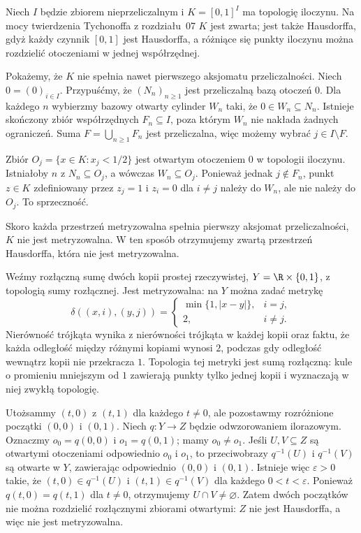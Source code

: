 \begin{przyklad}
\label{ex:topog-kostka-nieprzeliczalna}
Niech $I$ będzie zbiorem nieprzeliczalnym i
$K=[0,1]^I$ ma topologię iloczynu.
Na mocy twierdzenia Tychonoffa z rozdziału~07
$K$ jest zwarta; jest także Hausdorffa, gdyż każdy
czynnik $[0,1]$ jest Hausdorffa, a różniące się punkty
iloczynu można rozdzielić otoczeniami w jednej
współrzędnej.

Pokażemy, że $K$ nie spełnia nawet pierwszego
aksjomatu przeliczalności. Niech $0=(0)_{i\in I}$.
Przypuśćmy, że $(N_n)_{n\ge1}$ jest przeliczalną
bazą otoczeń $0$. Dla każdego $n$ wybierzmy
bazowy otwarty cylinder $W_n$ taki, że
$0\in W_n\subseteq N_n$. Istnieje skończony
zbiór współrzędnych $F_n\subseteq I$, poza którym
$W_n$ nie nakłada żadnych ograniczeń.
Suma $F=\bigcup_{n\ge1}F_n$ jest przeliczalna,
więc możemy wybrać $j\in I\setminus F$.

Zbiór $O_j=\{x\in K:x_j<1/2\}$ jest otwartym
otoczeniem $0$ w topologii iloczynu.
Istniałoby $n$ z $N_n\subseteq O_j$,
a wówczas $W_n\subseteq O_j$.
Ponieważ jednak $j\notin F_n$, punkt $z\in K$
zdefiniowany przez $z_j=1$ i $z_i=0$ dla $i\ne j$
należy do $W_n$, ale nie należy do $O_j$.
To sprzeczność.

Skoro każda przestrzeń metryzowalna spełnia
pierwszy aksjomat przeliczalności, $K$ nie jest
metryzowalna. W ten sposób otrzymujemy zwartą
przestrzeń Hausdorffa, która nie jest metryzowalna.
\end{przyklad}

\clearpage
\begin{przyklad}
\label{ex:topog-iloraz-dwa-poczatki}
Weźmy rozłączną sumę dwóch kopii prostej rzeczywistej,
$Y=\R\times\{0,1\}$, z topologią sumy rozłącznej.
Jest metryzowalna: na $Y$ można zadać metrykę
\[
\delta((x,i),(y,j))=
\begin{cases}
\min\{1,|x-y|\},&i=j,\\
2,&i\ne j.
\end{cases}
\]
Nierówność trójkąta wynika z nierówności trójkąta
w każdej kopii oraz faktu, że każda odległość między
różnymi kopiami wynosi $2$, podczas gdy odległość
wewnątrz kopii nie przekracza $1$.
Topologia tej metryki jest sumą rozłączną: kule
o promieniu mniejszym od $1$ zawierają punkty tylko
jednej kopii i wyznaczają w niej zwykłą topologię.

Utożsammy $(t,0)$ z $(t,1)$ dla każdego $t\ne0$,
ale pozostawmy rozróżnione początki $(0,0)$ i $(0,1)$.
Niech $q\colon Y\to Z$ będzie odwzorowaniem ilorazowym.
Oznaczmy $o_0=q(0,0)$ i $o_1=q(0,1)$; mamy $o_0\ne o_1$.
Jeśli $U,V\subseteq Z$ są otwartymi otoczeniami
odpowiednio $o_0$ i $o_1$, to przeciwobrazy
$q^{-1}(U)$ i $q^{-1}(V)$ są otwarte w $Y$,
zawierając odpowiednio $(0,0)$ i $(0,1)$.
Istnieje więc $\varepsilon>0$ takie, że
$(t,0)\in q^{-1}(U)$ i $(t,1)\in q^{-1}(V)$
dla każdego $0<t<\varepsilon$.
Ponieważ $q(t,0)=q(t,1)$ dla $t\ne0$, otrzymujemy
$U\cap V\ne\varnothing$. Zatem dwóch początków
nie można rozdzielić rozłącznymi zbiorami otwartymi:
$Z$ nie jest Hausdorffa, a więc nie jest metryzowalna.
\end{przyklad}


